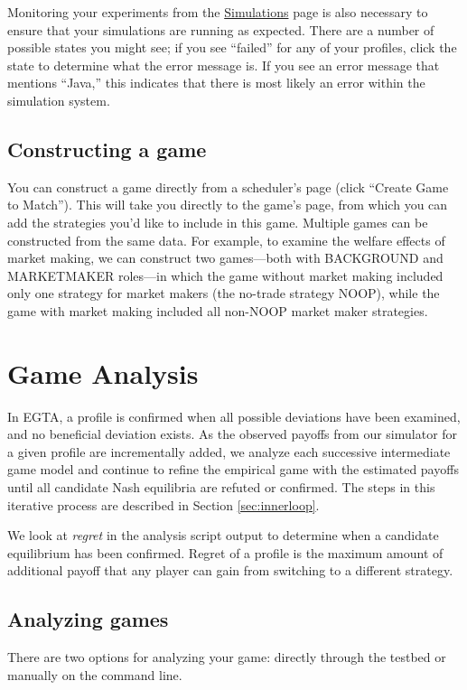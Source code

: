\documentclass[11pt]{article}
\begin{document}
Monitoring your experiments from the \href{http://egtaonline.eecs.umich.edu/simulations}{Simulations} page is also necessary to ensure that your simulations are running as expected.
There are a number of possible states you might see; if you see ``failed'' for any of your profiles, click the state to determine what the error message is. If you see an error message that mentions ``Java,'' this indicates that there is most likely an error within the simulation system.

\subsection{Constructing a game}

You can construct a game directly from a scheduler's page (click ``Create Game to Match''). This will take you directly to the game's page, from which you can add the strategies you'd like to include in this game.
Multiple games can be constructed from the same data.
For example, to examine the welfare effects of market making, we can construct two games---both with BACKGROUND and MARKETMAKER roles---in which the game without market making included only one strategy for market makers (the no-trade strategy NOOP), while the game with market making included all non-NOOP market maker strategies.


\section{Game Analysis}
\label{sec:analysis}

In EGTA, a profile is confirmed when all possible deviations have been examined, and no beneficial deviation exists.
As the observed payoffs from our simulator for a given profile are incrementally added, we analyze each successive intermediate game model and continue to refine the empirical game with the estimated payoffs until all candidate Nash equilibria are refuted or confirmed. The steps in this iterative process are described in Section \ref{sec:innerloop}.

We look at \emph{regret} in the analysis script output to determine when a candidate equilibrium has been confirmed. Regret of a profile is the maximum amount of additional payoff that any player can gain from switching to a different strategy.

\subsection{Analyzing games}
There are two options for analyzing your game: directly through the testbed or manually on the command line.
\end{document}
